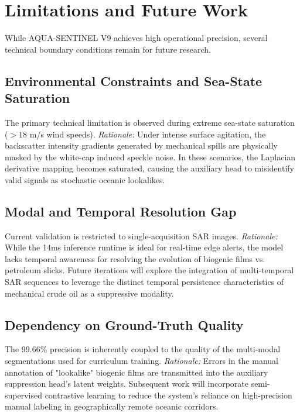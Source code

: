 \section{Limitations and Future Work}
While AQUA-SENTINEL V9 achieves high operational precision, several technical boundary conditions remain for future research.

\subsection{Environmental Constraints and Sea-State Saturation}
The primary technical limitation is observed during extreme sea-state saturation ($>18$ m/s wind speeds). \textit{Rationale:} Under intense surface agitation, the backscatter intensity gradients generated by mechanical spills are physically masked by the white-cap induced speckle noise. In these scenarios, the Laplacian derivative mapping becomes saturated, causing the auxiliary head to misidentify valid signals as stochastic oceanic lookalikes. 

\subsection{Modal and Temporal Resolution Gap}
Current validation is restricted to single-acquisition SAR images. \textit{Rationale:} While the 14ms inference runtime is ideal for real-time edge alerts, the model lacks temporal awareness for resolving the evolution of biogenic films vs. petroleum slicks. Future iterations will explore the integration of multi-temporal SAR sequences to leverage the distinct temporal persistence characteristics of mechanical crude oil as a suppressive modality.

\subsection{Dependency on Ground-Truth Quality}
The 99.66\% precision is inherently coupled to the quality of the multi-modal segmentations used for curriculum training. \textit{Rationale:} Errors in the manual annotation of "lookalike" biogenic films are transmitted into the auxiliary suppression head's latent weights. Subsequent work will incorporate semi-supervised contrastive learning to reduce the system's reliance on high-precision manual labeling in geographically remote oceanic corridors.
